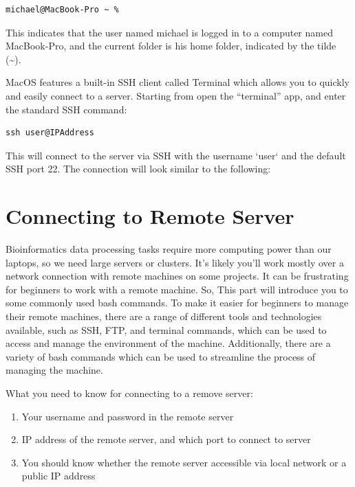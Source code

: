 \documentclass[
  letterpaper,
  DIV=11,
  numbers=noendperiod]{scrreprt}
\begin{document}
\begin{verbatim}
michael@MacBook-Pro ~ %
\end{verbatim}

This indicates that the user named michael is logged in to a computer
named MacBook-Pro, and the current folder is his home folder, indicated
by the tilde (\textasciitilde).

MacOS features a built-in SSH client called Terminal which allows you to
quickly and easily connect to a server. Starting from open the
``terminal'' app, and enter the standard SSH command:

\begin{verbatim}
ssh user@IPAddress
\end{verbatim}

This will connect to the server via SSH with the username `user` and the
default SSH port 22. The connection will look similar to the following:

\hypertarget{connecting-to-remote-server}{%
\section{Connecting to Remote
Server}\label{connecting-to-remote-server}}

Bioinformatics data processing tasks require more computing power than
our laptops, so we need large servers or clusters. It's likely you'll
work mostly over a network connection with remote machines on some
projects. It can be frustrating for beginners to work with a remote
machine. So, This part will introduce you to some commonly used bash
commands. To make it easier for beginners to manage their remote
machines, there are a range of different tools and technologies
available, such as SSH, FTP, and terminal commands, which can be used to
access and manage the environment of the machine. Additionally, there
are a variety of bash commands which can be used to streamline the
process of managing the machine.

What you need to know for connecting to a remove server:

\begin{enumerate}
\def\labelenumi{\arabic{enumi}.}
\item
  Your username and password in the remote server
\item
  IP address of the remote server, and which port to connect to server
\item
  You should know whether the remote server accessible via local network
  or a public IP address
\end{enumerate}
\end{document}
